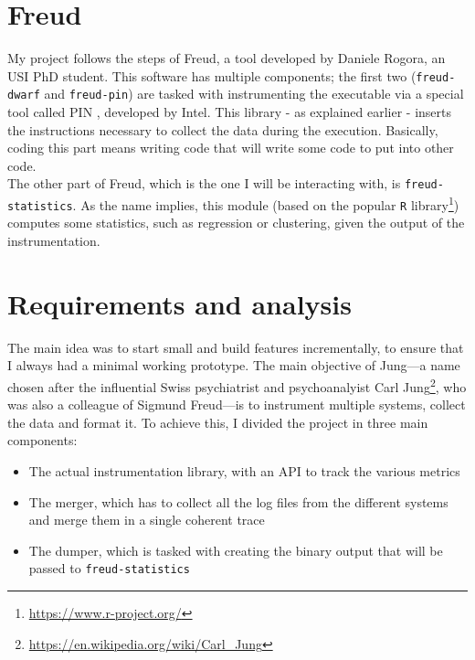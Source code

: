     \section{Freud}\label{sec:freud}


        My project follows the steps of Freud, a tool developed by Daniele Rogora, an USI PhD student.
        This software has multiple components; the first two (\texttt{freud-dwarf} and \texttt{freud-pin})
        are tasked with instrumenting the executable 
        via a special tool called PIN \cite{pin}, developed by Intel. This library - as explained earlier - 
        inserts the instructions necessary to collect the data during the execution. Basically, coding this
        part means writing code that will write some code to put into other code.\\

        The other part of Freud, which is the one I will be interacting with, is \texttt{freud-statistics}.
        As the name implies, this module (based on the popular \texttt{R} library\footnote{\url{https://www.r-project.org/}})
        computes some statistics, such as regression or clustering, given the output of the instrumentation.


    \section{Requirements and analysis}\label{sec:requirements}


        The main idea was to start small and build features incrementally, to ensure that I always
        had a minimal working prototype.  The main objective of
        Jung---a name chosen after the influential Swiss psychiatrist
        and psychoanalyist Carl
        Jung\footnote{\url{https://en.wikipedia.org/wiki/Carl_Jung}},
        who was also a colleague of Sigmund Freud---is to instrument multiple systems, collect the data and format it.
        To achieve this, I divided the project in three main components:

        \begin{itemize}
            \item The actual instrumentation library, with an API to track the various metrics
            \item The merger, which has to collect all the log files from the different systems
             and merge them in a single coherent trace
            \item The dumper, which is tasked with creating the binary output that will be passed
             to \texttt{freud-statistics}
        \end{itemize}

